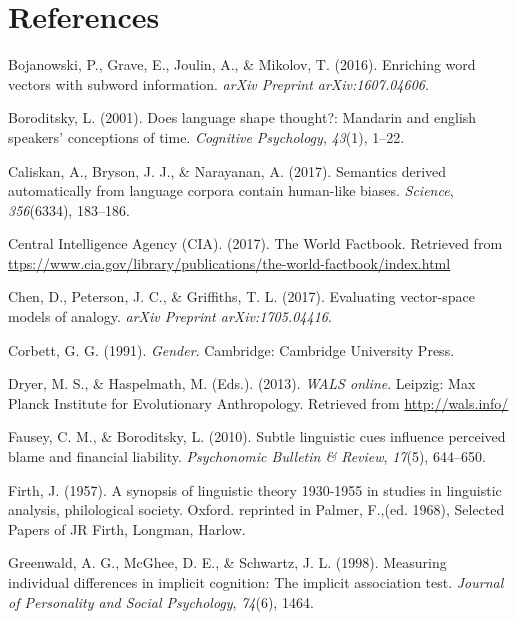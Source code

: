 \documentclass[10pt, letterpaper]{article}
\begin{document}
\section{References}\label{references}

\setlength{\parindent}{-0.1in} \setlength{\leftskip}{0.125in} \noindent
\newcommand{\squeezeup}{\vspace{-10mm}}

\hypertarget{refs}{}
\hypertarget{ref-bojanowski2016enriching}{}
Bojanowski, P., Grave, E., Joulin, A., \& Mikolov, T. (2016). Enriching
word vectors with subword information. \emph{arXiv Preprint
arXiv:1607.04606}.

\hypertarget{ref-boroditsky2001does}{}
Boroditsky, L. (2001). Does language shape thought?: Mandarin and
english speakers' conceptions of time. \emph{Cognitive Psychology},
\emph{43}(1), 1--22.

\hypertarget{ref-caliskan2017semantics}{}
Caliskan, A., Bryson, J. J., \& Narayanan, A. (2017). Semantics derived
automatically from language corpora contain human-like biases.
\emph{Science}, \emph{356}(6334), 183--186.

\hypertarget{ref-ciafactbook}{}
Central Intelligence Agency (CIA). (2017). The World Factbook. Retrieved
from
\url{ttps://www.cia.gov/library/publications/the-world-factbook/index.html}

\hypertarget{ref-chen2017evaluating}{}
Chen, D., Peterson, J. C., \& Griffiths, T. L. (2017). Evaluating
vector-space models of analogy. \emph{arXiv Preprint arXiv:1705.04416}.

\hypertarget{ref-corbett1991}{}
Corbett, G. G. (1991). \emph{Gender}. Cambridge: Cambridge University
Press.

\hypertarget{ref-wals}{}
Dryer, M. S., \& Haspelmath, M. (Eds.). (2013). \emph{WALS online}.
Leipzig: Max Planck Institute for Evolutionary Anthropology. Retrieved
from \url{http://wals.info/}

\hypertarget{ref-fausey2010subtle}{}
Fausey, C. M., \& Boroditsky, L. (2010). Subtle linguistic cues
influence perceived blame and financial liability. \emph{Psychonomic
Bulletin \& Review}, \emph{17}(5), 644--650.

\hypertarget{ref-firth1957synopsis}{}
Firth, J. (1957). A synopsis of linguistic theory 1930-1955 in studies
in linguistic analysis, philological society. Oxford. reprinted in
Palmer, F.,(ed. 1968), Selected Papers of JR Firth, Longman, Harlow.

\hypertarget{ref-greenwald1998measuring}{}
Greenwald, A. G., McGhee, D. E., \& Schwartz, J. L. (1998). Measuring
individual differences in implicit cognition: The implicit association
test. \emph{Journal of Personality and Social Psychology}, \emph{74}(6),
1464.
\end{document}
